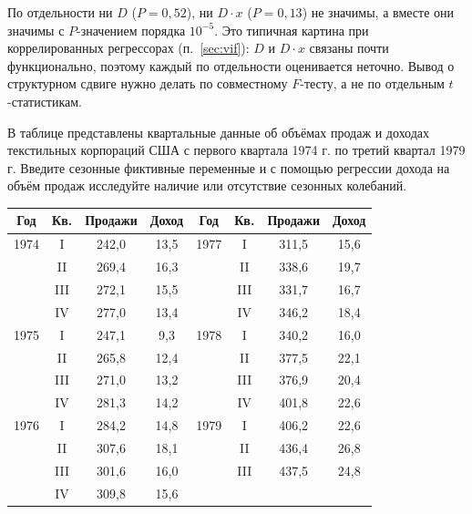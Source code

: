 \begin{solution}
\begin{remark}
По отдельности ни $D$ ($P = 0{,}52$), ни $D\cdot x$ ($P = 0{,}13$) не значимы, а
вместе они значимы с $P$-значением порядка $10^{-5}$. Это типичная картина при
коррелированных регрессорах (п.~\ref{sec:vif}): $D$ и $D\cdot x$ связаны почти
функционально, поэтому каждый по отдельности оценивается неточно. Вывод о
структурном сдвиге нужно делать по совместному $F$-тесту, а не по отдельным
$t$-статистикам.
\end{remark}
\end{solution}

\ifsolutions\clearpage\fi
{}

В таблице представлены квартальные данные об объёмах продаж и доходах
текстильных корпораций США с первого квартала 1974 г. по третий квартал
1979 г. Введите сезонные фиктивные переменные и с помощью регрессии дохода на
объём продаж исследуйте наличие или отсутствие сезонных колебаний.

\begin{center}
\small
\begin{tabular}{cccc @{\qquad} cccc}
\toprule
Год & Кв. & Продажи & Доход & Год & Кв. & Продажи & Доход \\
\midrule
1974 & I   & 242,0 & 13,5 & 1977 & I   & 311,5 & 15,6 \\
     & II  & 269,4 & 16,3 &      & II  & 338,6 & 19,7 \\
     & III & 272,1 & 15,5 &      & III & 331,7 & 16,7 \\
     & IV  & 277,0 & 13,4 &      & IV  & 346,2 & 18,4 \\
\midrule
1975 & I   & 247,1 & \phantom{0}9,3 & 1978 & I   & 340,2 & 16,0 \\
     & II  & 265,8 & 12,4 &      & II  & 377,5 & 22,1 \\
     & III & 271,0 & 13,2 &      & III & 376,9 & 20,4 \\
     & IV  & 281,3 & 14,2 &      & IV  & 401,8 & 22,6 \\
\midrule
1976 & I   & 284,2 & 14,8 & 1979 & I   & 406,2 & 22,6 \\
     & II  & 307,6 & 18,1 &      & II  & 436,4 & 26,8 \\
     & III & 301,6 & 16,0 &      & III & 437,5 & 24,8 \\
     & IV  & 309,8 & 15,6 &      &     &       &      \\
\bottomrule
\end{tabular}
\end{center}

